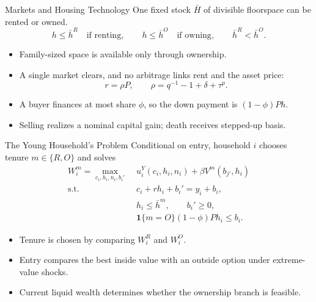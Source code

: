 \documentclass[aspectratio=169,11pt]{beamer}
\newcommand{\tightitems}{\setlength{\itemsep}{0.55em}}
\newcommand{\1}{\mathbf 1}
\begin{document}
\begin{frame}{Markets and Housing Technology}
  One fixed stock $\bar H$ of divisible floorspace can be rented or owned.
  \[
    h\le \bar h^R \quad\text{if renting},
    \qquad
    h\le \bar h^O \quad\text{if owning},
    \qquad
    \bar h^R<\bar h^O.
  \]

  \begin{itemize}\tightitems
    \item Family-sized space is available only through ownership.
    \item A single market clears, and no arbitrage links rent and the asset price:
    \[
      r=\rho P,
      \qquad
      \rho=q^{-1}-1+\delta+\tau^p.
    \]
    \item A buyer finances at most share $\phi$, so the down payment is $(1-\phi)Ph$.
    \item Selling realizes a nominal capital gain; death receives stepped-up basis.
  \end{itemize}
\end{frame}

\begin{frame}{The Young Household's Problem}
  Conditional on entry, household $i$ chooses tenure $m\in\{R,O\}$ and solves
  \[
  \begin{aligned}
    W_i^m=\max_{c_i,h_i,n_i,b_i'}\;&u_i^Y(c_i,h_i,n_i)
      +\beta V^m(b_{j'},h_i)\\
    \text{s.t.}\quad
      &c_i+r h_i+b_i'=y_i+b_i,\\
      &h_i\le\bar h^m,\qquad b_i'\ge0,\\
      &\1\{m=O\}(1-\phi)Ph_i\le b_i.
  \end{aligned}
  \]

  \begin{itemize}\tightitems
    \item Tenure is chosen by comparing $W_i^R$ and $W_i^O$.
    \item Entry compares the best inside value with an outside option under extreme-value shocks.
    \item Current liquid wealth determines whether the ownership branch is feasible.
  \end{itemize}
\end{frame}
\end{document}
